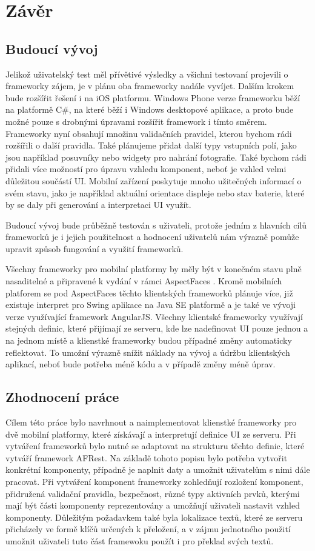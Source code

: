 \chapter{Závěr}
\section{Budoucí vývoj}
Jelikož uživatelský test měl přívětivé výsledky a všichni testovaní projevili o frameworky zájem, je v plánu oba frameworky nadále vyvíjet. Dalším krokem bude rozšířit řešení i na iOS platformu. Windows Phone verze frameworku běží na platformě C\#, na které běží i Windows desktopové aplikace, a proto bude možné pouze s drobnými úpravami rozšířit framework i tímto směrem. Frameworky nyní obsahují množinu validačních pravidel, kterou bychom rádi rozšířili o další pravidla. Také plánujeme přidat další typy vstupních polí, jako jsou například posuvníky nebo widgety pro nahrání fotografie. Také bychom rádi přidali více možností pro úpravu vzhledu komponent, neboť je vzhled velmi důležitou součástí UI. Mobilní zařízení poskytuje mnoho užitečných informací o svém stavu, jako je například aktuální orientace displeje nebo stav baterie, které by se daly při generování a interpretaci UI využít.

Budoucí vývoj bude průběžně testován s uživateli, protože jedním z hlavních cílů frameworků je i jejich použitelnost a hodnocení uživatelů nám výrazně pomůže upravit způsob fungování a využití frameworků.

Všechny frameworky pro mobilní platformy by měly být v konečném stavu plně nasaditelné a připravené k vydání v rámci AspectFaces \cite{aspect-faces}. Kromě mobilních platforem se pod AspectFaces těchto klientských frameworků plánuje více, již existuje interpret pro Swing aplikace na Java SE platformě a je také ve vývoji verze využívající framework AngularJS. Všechny klientské frameworky využívají stejných definic, které přijímají ze serveru, kde lze nadefinovat UI pouze jednou a na jednom místě a klienstké frameworky budou případné změny automaticky reflektovat. To umožní výrazně snížit náklady na vývoj a údržbu klientských aplikací, neboť bude potřeba méně kódu a v případě změny méně úprav.

\section{Zhodnocení práce}
Cílem této práce bylo navrhnout a naimplementovat klienstké frameworky pro dvě mobilní platformy, které získávají a interpretují definice UI ze serveru. Při vytváření frameworků bylo nutné se adaptovat na strukturu těchto definic, které vytváří framework AFRest. Na základě tohoto popisu bylo potřeba vytvořit konkrétní komponenty, případně je naplnit daty a umožnit uživatelům s nimi dále pracovat. Při vytváření komponent frameworky zohledňují rozložení komponent, přidružená validační pravidla, bezpečnost, různé typy aktivních prvků, kterými mají být části komponenty reprezentovány a umožňují uživateli nastavit vzhled komponenty. Důležitým požadavkem také byla lokalizace textů, které ze serveru přicházely ve formě klíčů určených k přeložení, a v zájmu jednotného použití umožnit uživateli tuto část framewoku použít i pro překlad svých textů. 

